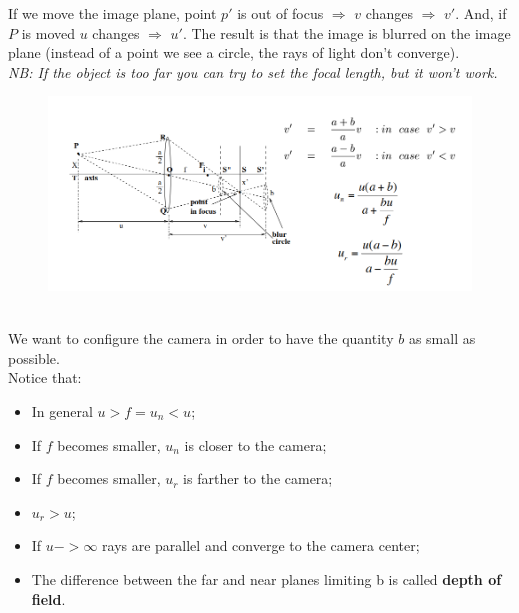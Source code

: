 If we move the image plane, point $p'$ is out of focus $\Rightarrow$ $v$ changes $\Rightarrow$ $v'$. And, if $P$ is moved $u$ changes $\Rightarrow$ $u'$.
The result is that the image is blurred on the image plane (instead of a point we see a circle, the rays of light don't converge).
\\\textit{NB: If the object is too far you can try to set the focal length, but it won't work.}
\begin{figure}[h]
    \centering
    \includegraphics[width=1\textwidth]{Figures/Focus.png}
\end{figure}
\\We want to configure the camera in order to have the quantity $b$ as small as possible.
\\Notice that:
\begin{itemize}
    \item In general $u > f = u_n < u$;
    \item If $f$ becomes smaller, $u_n$ is closer to the camera;
    \item If $f$ becomes smaller, $u_r$ is farther to the camera;
    \item $u_r > u$;
    \item If $u -> \infty$ rays are parallel and converge to the camera center;
    \item The difference between the far and near planes limiting b is called \textbf{depth of field}. 
\end{itemize}


